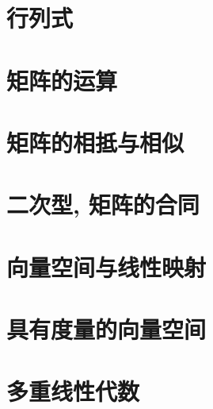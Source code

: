 \chapter{行列式}









\chapter{矩阵的运算}









\chapter{矩阵的相抵与相似}







\chapter{二次型, 矩阵的合同}





\chapter{向量空间与线性映射}





\chapter{具有度量的向量空间}







\chapter{多重线性代数}
